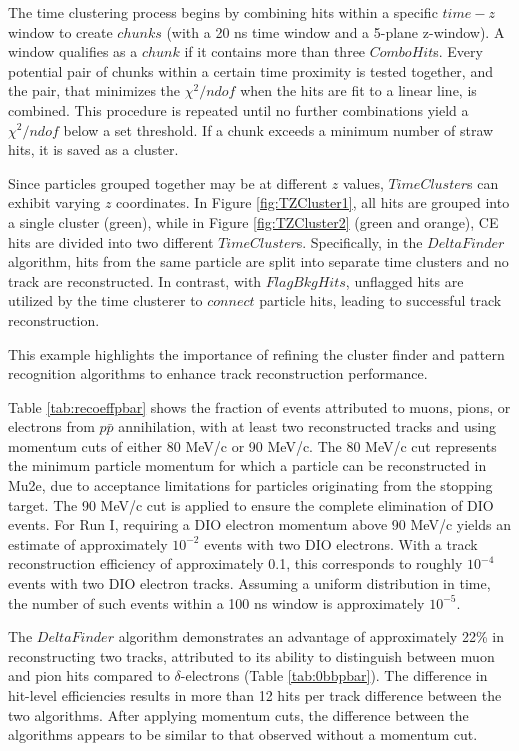 The time clustering process begins by combining hits within a specific $time-z$ 
window to create $chunks$ (with a 20 ns time window and a 5-plane z-window). 
A window qualifies as a $chunk$ if it contains more than three $ComboHit$s. 
Every potential pair of chunks within a certain time 
proximity is tested together, and the pair, that minimizes 
the $\chi^2/ndof$ when the hits are fit to a linear line, 
is combined. This procedure is repeated until no further combinations 
yield a $\chi^2/ndof$ below a set threshold. If a chunk 
exceeds a minimum number of straw hits, it is saved as a cluster.

Since particles grouped together may be at different $z$ values, 
$TimeCluster$s can exhibit varying $z$ coordinates. In Figure \ref{fig:TZCluster1}, 
all hits are grouped into a single cluster (green), 
while in Figure \ref{fig:TZCluster2} (green and orange), CE hits are divided into 
two different $TimeCluster$s.  
Specifically, in the $DeltaFinder$ algorithm, hits from the same 
particle are split into separate time clusters and no 
track are reconstructed. In contrast, with $FlagBkgHits$, 
unflagged hits are utilized by the time clusterer to $connect$ particle hits, 
leading to successful track reconstruction. 

This example highlights the importance of refining 
the cluster finder and pattern recognition algorithms to 
enhance track reconstruction performance.


Table \ref{tab:recoeffpbar} shows the fraction of events attributed 
to muons, pions, or electrons from $p\bar{p}$ annihilation, 
with at least two reconstructed tracks and using momentum cuts of 
either 80 MeV/c or 90 MeV/c. The 80 MeV/c cut represents the 
minimum particle momentum for which a particle can be reconstructed 
in Mu2e, due to acceptance limitations for particles originating from 
the stopping target. The 90 MeV/c cut is applied to ensure 
the complete elimination of DIO events. For Run I, requiring a 
DIO electron momentum above 90 MeV/c yields an estimate of 
approximately $10^{-2}$ events with two DIO electrons. With a 
track reconstruction efficiency of approximately 0.1, this corresponds 
to roughly $10^{-4}$ events with two DIO electron tracks. Assuming a 
uniform distribution in time, the number of such events within a 
100 ns window is approximately $10^{-5}$.

The $DeltaFinder$ algorithm demonstrates an advantage of 
approximately 22\% in reconstructing two tracks, attributed to 
its ability to distinguish between muon and pion hits compared to 
$\delta$-electrons (Table \ref{tab:0bbpbar}). The difference in 
hit-level efficiencies results in more than 12 hits per track difference 
between the two algorithms. After applying momentum cuts, the 
difference between the algorithms appears to be similar to that 
observed without a momentum cut.


